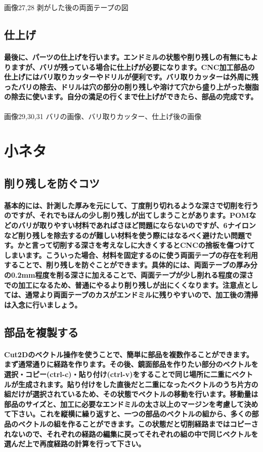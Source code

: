 \documentclass[b5paper, 9pt, twocolumn, titlepage,openany]{jsbook}%
\begin{document}
画像27,28 剥がした後の両面テープの図

\subsection{仕上げ}
\paragraph{最後に、パーツの仕上げを行います。エンドミルの状態や削り残しの有無にもよりますが、バリが残っている場合に仕上げが必要になります。CNC加工部品の仕上げにはバリ取りカッターやドリルが便利です。バリ取りカッターは外周に残ったバリの除去、ドリルは穴の部分の削り残しや溶けて穴から盛り上がった樹脂の除去に使います。自分の満足の行くまで仕上げができたら、部品の完成です。}

画像29,30,31 バリの画像、バリ取りカッター、仕上げ後の画像

\section{小ネタ}
\subsection{削り残しを防ぐコツ}
\paragraph{基本的には、計測した厚みを元にして、丁度削り切れるような深さで切削を行うのですが、それでもほんの少し削り残しが出てしまうことがあります。POMなどのバリが取りやすい材料であればさほど問題にならないのですが、6ナイロンなど削り残しを除去するのが難しい材料を使う際にはなるべく避けたい問題です。かと言って切削する深さを考えなしに大きくするとCNCの捨板を傷つけてしまいます。こういった場合、材料を固定するのに使う両面テープの存在を利用することで、削り残しを防ぐことができます。具体的には、両面テープの厚み分の0.2mm程度を削る深さに加えることで、両面テープが少し削れる程度の深さでの加工になるため、普通にやるより削り残しが出にくくなります。注意点としては、通常より両面テープのカスがエンドミルに残りやすいので、加工後の清掃は入念に行いましょう。}

\subsection{部品を複製する}
\paragraph{Cut2Dのベクトル操作を使うことで、簡単に部品を複数作ることができます。まず通常通りに経路を作ります。その後、鏡面部品を作りたい部分のベクトルを選択・コピー(ctrl-c)・貼り付け(ctrl-v)をすることで同じ場所に二重にベクトルが生成されます。貼り付けをした直後だと二重になったベクトルのうち片方の組だけが選択されているため、その状態でベクトルの移動を行います。移動量は部品のサイズと、加工に必要なエンドミルの太さ以上のマージンを考慮して決めて下さい。これを縦横に繰り返すと、一つの部品のベクトルの組から、多くの部品のベクトルの組を作ることができます。この状態だと切削経路まではコピーされないので、それぞれの経路の編集に戻ってそれぞれの組の中で同じベクトルを選んだ上で再度経路の計算を行って下さい。}
\end{document}
